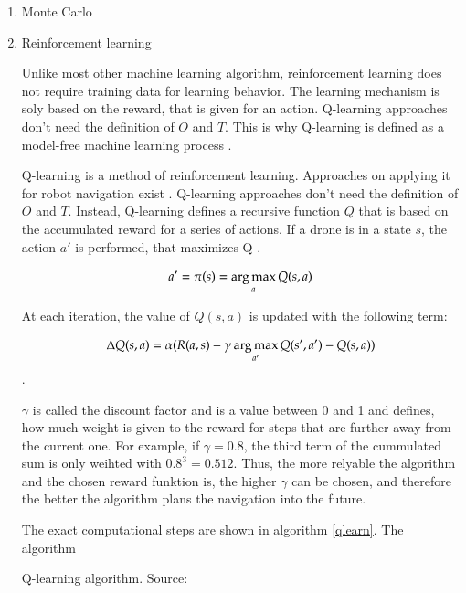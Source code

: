 	\begin{enumerate}
	
	\item{Monte Carlo}
	
	
	\item{Reinforcement learning}
	
	Unlike most other machine learning algorithm, reinforcement learning does not require training data for learning behavior. The learning mechanism is soly based 
	on the reward, that is given for an action. %
	Q-learning approaches don't need the definition of $O$ and $T$. This is why Q-learning is defined as a model-free machine learning process \cite{deep}. 
	
	Q-learning is a method of reinforcement learning. Approaches on applying it for robot navigation exist \cite{accurat}\cite{deep}\cite{lopez}. Q-learning approaches don't need the definition of $O$ and $T$.
	Instead, Q-learning defines a recursive function $Q$ that is based on the accumulated reward for a series of actions. If a drone is in a state $s$, the action $a'$ is performed, 
	that maximizes Q \cite{lopez}. 
	
	$$a' = \pi(s) = \mathop{\mathrm{arg\,max}}_{a} Q(s,a)$$
	
	At each iteration, the value of $Q(s,a)$ is updated with the following term: 
	
	$$ \Delta Q(s,a) = \alpha(R(a,s) + 	\gamma \mathop{\mathrm{arg\,max}}_{a'}Q(s', a') - Q(s, a))$$.
	
	$\gamma$ is called the discount factor and is a value between 0 and 1 and defines, how much weight is given to the reward for steps that are further away from the current one. 
	For example, if $\gamma = 0.8$, the third term of the cummulated sum is only weihted with ${0.8}^3 = 0.512$. Thus, the more relyable the algorithm 
	and the chosen reward funktion is, the higher $\gamma$ can be chosen, and therefore the better the algorithm plans the navigation into the future. 
	
	The exact computational steps are shown in algorithm \ref{qlearn}. 
	The algorithm 
	
	
	\begin{algorithm}[H]
	\KwData{Parameters: $\alpha \in (0,1], \gamma \in (0,1],$ \ Initialize Q-table with arbitrary Q-values }
	\caption{Q-learning algorithm. Source: \cite{deep}}\label{qlearn}
	\end{algorithm}
	

\end{enumerate}
